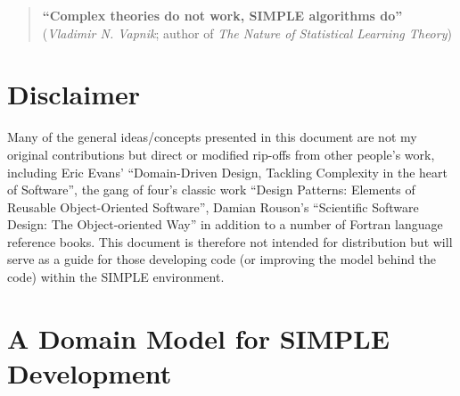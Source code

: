 \documentclass[a4paper,11pt]{article}
\begin{document}
\begin{quote}
\textbf{``Complex theories do not work, SIMPLE algorithms do''}\\(\textit{Vladimir N. Vapnik}; author of \textit{The Nature of Statistical Learning Theory})
\end{quote}
\clearpage

\tableofcontents{}
\clearpage

\section{Disclaimer}
Many of the general ideas/concepts presented in this document are not my original contributions but direct or modified rip-offs from other people's work, including Eric Evans' ``Domain-Driven Design, Tackling Complexity in the heart of Software'', the gang of four's classic work ``Design Patterns: Elements of Reusable Object-Oriented Software'', Damian Rouson's ``Scientific Software Design: The Object-oriented Way'' in addition to a number of Fortran language reference books. This document is therefore not intended for distribution but will serve as a guide for those developing code (or improving the model behind the code) within the SIMPLE environment.

\section{A Domain Model for SIMPLE Development}
\end{document}
